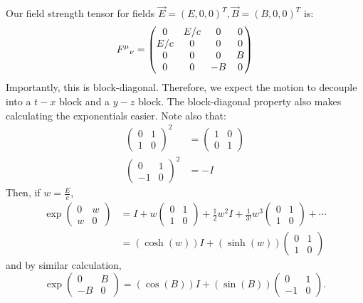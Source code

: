 \documentclass[../Main.tex]{subfiles}
\begin{document}
Our field strength tensor for fields $\vec{E} = (E, 0, 0)^T, \vec{B} = (B, 0, 0)^T$ is:
\begin{equation*}
    \indx{F}\mu\nu =
    \begin{pmatrix}
        0 & E/c & 0 & 0 \\
        E/c & 0 & 0 & 0 \\
        0 & 0 & 0 & B \\
        0 & 0 & -B & 0
    \end{pmatrix}
\end{equation*}
Importantly, this is block-diagonal. Therefore, we expect the motion to decouple into a $t-x$ block and a $y-z$ block. The block-diagonal property also makes calculating the exponentials easier. Note also that:
\begin{align*}
    \begin{pmatrix}
        0 & 1 \\
        1 & 0
    \end{pmatrix}
    ^2 &= \begin{pmatrix}
        1 & 0 \\
        0 & 1
    \end{pmatrix}
     \\
    \begin{pmatrix}
        0 & 1 \\
        -1 & 0
    \end{pmatrix}^2
    &= -I
\end{align*}
Then, if $w = \frac{E}{c}$,
\begin{align*}
    \exp \begin{pmatrix}
        0 & w \\
        w & 0
    \end{pmatrix}
    &= I + w \begin{pmatrix}
        0 & 1 \\
        1 & 0
    \end{pmatrix}
    + \frac12 w^2 I + \frac1{3!} w^3 \begin{pmatrix}
        0 & 1 \\
        1 & 0
    \end{pmatrix}
    + \cdots \\
    &= \left(\cosh(w)\right) I + (\sinh(w)) \begin{pmatrix}
        0 & 1 \\
        1 & 0
    \end{pmatrix}
\end{align*}
and by similar calculation,
\begin{equation*}
    \exp \begin{pmatrix}
        0 & B \\
        -B & 0
    \end{pmatrix}
    = (\cos(B)) I + (\sin(B)) \begin{pmatrix}
        0 & 1 \\
        -1 & 0
    \end{pmatrix}.
\end{equation*}
\end{document}
